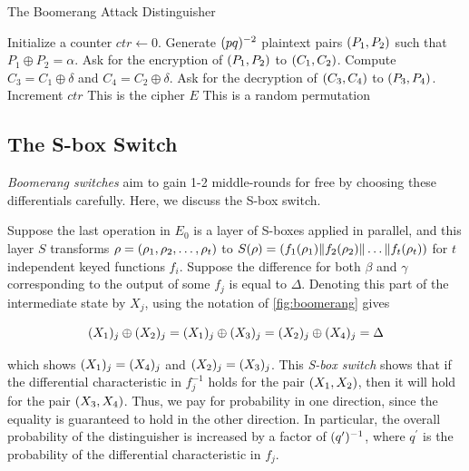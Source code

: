 \documentclass[twoside]{article}
\begin{document}
\begin{algorithm}
    \caption{The Boomerang Attack Distinguisher}
    \label{alg:boomerang-dist}
    \begin{algorithmic}[1]
        \State Initialize a counter \(ctr \gets 0\). 
        \State Generate \((pq)^{-2}\) plaintext pairs \((P_1, P_2)\)
        such that \(P_1 \oplus P_2 = \alpha\).
            \State Ask for the encryption of \((P_1, P_2)\) to \((C_1,
            C_2)\).
            \State Compute \(C_3 = C_1 \oplus \delta\) and \(C_4 = C_2 \oplus 
            \delta\). 
            \State Ask for the decryption of \((C_3, C_4)\) to \((P_3,
            P_4)\).
                \State Increment \(ctr\)
            \EndIf
        \EndFor
            \State \Return This is the cipher \(E\)
        \Else
            \State \Return This is a random permutation
        \EndIf
    \end{algorithmic}
\end{algorithm}

\subsection{The S-box Switch}

\emph{Boomerang switches} aim to gain 1-2 middle-rounds for free by choosing
these differentials carefully. Here, we discuss the S-box switch.

Suppose the last operation in \(E_0\) is a layer of S-boxes applied in parallel,
and this layer \(S\) transforms \(\rho = (\rho_1, \rho_2, \ldots, \rho_t)\)
to \(S(\rho) =
(f_1(\rho_1)\|f_2(\rho_2)\|\ldots\|f_t(\rho_t))\) for \(t\)
independent keyed functions \(f_i\). Suppose the difference for both \(\beta\)
and \(\gamma\) corresponding to the output of some \(f_j\) is equal to
\(\Delta\). Denoting this part of the intermediate state by \(X_j\), using the
notation of \autoref{fig:boomerang} gives

\begin{equation}
    (X_1)_j \oplus (X_2)_j = (X_1)_j \oplus (X_3)_j = (X_2)_j \oplus (X_4)_j = \Delta
    \label{eq:s-switch}
\end{equation}

which shows \((X_1)_j = (X_4)_j\) and \((X_2)_j = (X_3)_j\).
This \emph{S-box switch} shows that if the differential characteristic in
\(f_j^{-1}\) holds for the pair \((X_1, X_2)\), then it will hold for the
pair \((X_3, X_4)\). Thus, we pay for probability in one direction, since
the equality is guaranteed to hold in the other direction. In particular, the
overall probability of the distinguisher is increased by a factor of
\((q^\prime)^{-1}\), where \(q^\prime\) is the probability of the
differential characteristic in \(f_j\).
\end{document}
